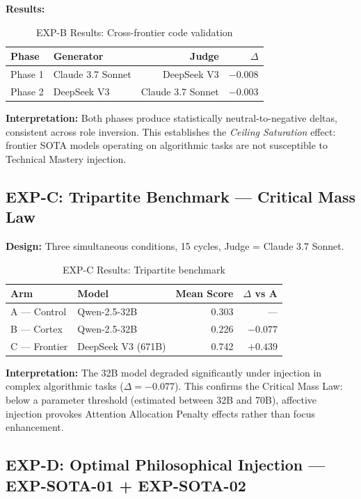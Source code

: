 \documentclass[12pt, a4paper]{article}
\begin{document}
\textbf{Results:}
\begin{table}[h]
\centering
\begin{tabular}{llrr}
\toprule
Phase & Generator & Judge & $\Delta$ \\
\midrule
Phase 1 & Claude 3.7 Sonnet & DeepSeek V3 & $-0.008$ \\
Phase 2 & DeepSeek V3 & Claude 3.7 Sonnet & $-0.003$ \\
\bottomrule
\end{tabular}
\caption{EXP-B Results: Cross-frontier code validation}
\end{table}

\textbf{Interpretation:} Both phases produce statistically neutral-to-negative deltas, consistent across role inversion. This establishes the \textit{Ceiling Saturation} effect: frontier SOTA models operating on algorithmic tasks are not susceptible to Technical Mastery injection.

\subsection{EXP-C: Tripartite Benchmark — Critical Mass Law}
\textbf{Design:} Three simultaneous conditions, 15 cycles, Judge = Claude 3.7 Sonnet.

\begin{table}[h]
\centering
\begin{tabular}{llrr}
\toprule
Arm & Model & Mean Score & $\Delta$ vs A \\
\midrule
A — Control & Qwen-2.5-32B & 0.303 & — \\
B — Cortex & Qwen-2.5-32B & 0.226 & $-0.077$ \\
C — Frontier & DeepSeek V3 (671B) & 0.742 & $+0.439$ \\
\bottomrule
\end{tabular}
\caption{EXP-C Results: Tripartite benchmark}
\end{table}

\textbf{Interpretation:} The 32B model degraded significantly under injection in complex algorithmic tasks ($\Delta = -0.077$). This confirms the Critical Mass Law: below a parameter threshold (estimated between 32B and 70B), affective injection provokes Attention Allocation Penalty effects rather than focus enhancement.

\subsection{EXP-D: Optimal Philosophical Injection — EXP-SOTA-01 + EXP-SOTA-02}
\end{document}
